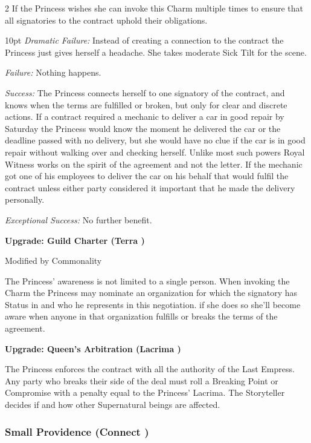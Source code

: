 \begin{multicols}{2}
If the Princess wishes she can invoke this Charm multiple times to ensure that all signatories to the contract uphold their obligations. 

\begin{myindentpar}{10pt}    \emph{Dramatic Failure:} Instead of creating a connection to the contract the Princess just gives herself a headache. She takes moderate Sick Tilt for the scene. 

\emph{Failure:} Nothing happens. 

\emph{Success:} The Princess connects herself to one signatory of the contract, and knows when the terms are fulfilled or broken, but only for clear and discrete actions. If a contract required a mechanic to deliver a car in good repair by Saturday the Princess would know the moment he delivered the car or the deadline passed with no delivery, but she would have no clue if the car is in good repair without walking over and checking herself. Unlike most such powers Royal Witness works on the spirit of the agreement and not the letter. If the mechanic got one of his employees to deliver the car on his behalf that would fulfil the contract unless either party considered it important that he made the delivery personally. 

\emph{Exceptional Success:} No further benefit.

    \textbf{Upgrade: Guild Charter (Terra \textbullet)}
	
	Modified by Commonality
	
	The Princess' awareness is not limited to a single person. When invoking the Charm the Princess may nominate an organization for which the signatory has Status in and who he represents in this negotiation. if she does so she'll become aware when anyone in that organization fulfills or breaks the terms of the agreement. 
	
	\textbf{Upgrade: Queen's Arbitration (Lacrima \textbullet\textbullet\textbullet)}
	
	The Princess enforces the contract with all the authority of the Last Empress. Any party who breaks their side of the deal must roll a Breaking Point or Compromise with a penalty equal to the Princess' Lacrima. The Storyteller decides if and how other Supernatural beings are affected.
	
 \end{myindentpar}


\subsubsection*{Small Providence (Connect \textbullet)}


\end{multicols}
